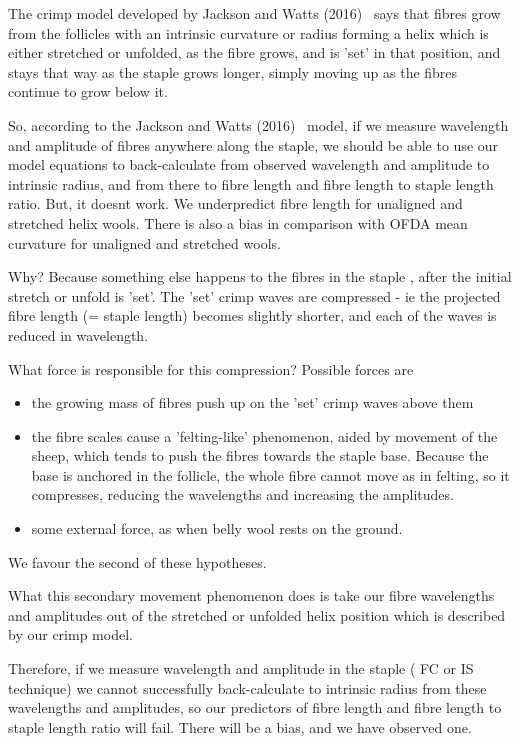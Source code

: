 \documentclass[titlepage,10pt]{article}  %
\begin{document}
The crimp model developed by Jackson and Watts (2016)~\cite{jack:16} says that fibres grow from the follicles with an intrinsic curvature or radius forming a helix which is either stretched or unfolded, as the fibre grows, and is 'set' in that position, and stays that way as the staple grows longer, simply moving up as the fibres continue to grow below it. 

So, according to the Jackson and Watts (2016)~\cite{jack:16} model, if we measure wavelength and amplitude of fibres anywhere along the staple, we should be able to use our model equations to back-calculate from observed wavelength and amplitude to intrinsic radius, and from there to fibre length and fibre length to staple length ratio. But, it doesnt work. We underpredict fibre length for unaligned and stretched helix wools. There is also a bias in comparison with OFDA mean curvature for unaligned and stretched wools.

Why? Because something else happens to the fibres in the staple , after the initial stretch or unfold is 'set'. The 'set' crimp waves are compressed - ie the projected fibre length (= staple length) becomes slightly shorter, and each of the waves is reduced in wavelength.

What force is responsible for this compression? Possible forces are 
\begin{itemize}
\item the growing mass of fibres push up on the 'set' crimp waves above them
\item the fibre scales cause a 'felting-like' phenomenon, aided by movement of the sheep, which tends to push the fibres towards the staple base. Because the base is anchored in the follicle, the whole fibre cannot move as in felting, so it compresses, reducing the wavelengths and increasing the amplitudes.
\item some external force, as when belly wool rests on the ground.
\end{itemize}

We favour the second of these hypotheses.

What this secondary movement phenomenon does is take our fibre wavelengths and amplitudes out of the stretched or unfolded helix position which is described by our crimp model.

Therefore, if we measure wavelength and amplitude in the staple ( FC or IS technique) we cannot successfully back-calculate to intrinsic radius from these wavelengths and amplitudes, so our predictors of fibre length and fibre length to staple length ratio will fail. There will be a bias, and we have observed one.
\end{document}
